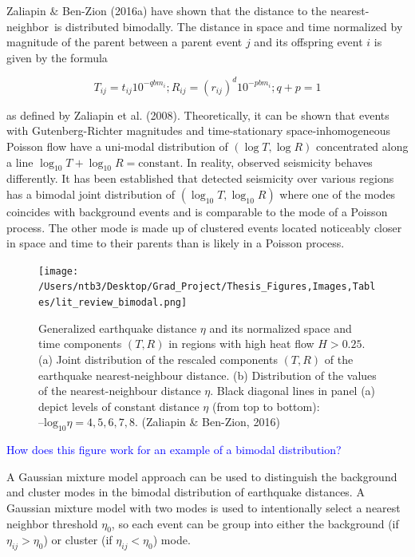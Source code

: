 \documentclass[12pt]{article} %
\theoremstyle{plain}
\begin{document}
	
	Zaliapin $\&$ Ben-Zion (2016a) have shown that the distance to the nearest-neighbor is distributed bimodally. The distance in space and time normalized by magnitude of the parent between a parent event $j$ and its offspring event $i$ is given by the formula
	
	
	\begin{equation} \label{eq:generalized_distance}
		T_{ij} = t_{ij}10^{-qbm_i};  R_{ij}= (r_{ij})^d10^{-pbm_i}; q+p=1
	\end{equation}
	
	\noindent as defined by Zaliapin et al. (2008). Theoretically, it can be shown that events with Gutenberg-Richter magnitudes and time-stationary space-inhomogeneous Poisson flow have a uni-modal distribution of $( \log T, \log R)$ concentrated along a line $\log_{10}T+ \log_{10}R = \text{constant}$. In reality, observed seismicity behaves differently. It has been established that detected seismicity over various regions has a bimodal joint distribution of $(\log_{10}T, \log_{10}R)$ where one of the modes coincides with background events and is comparable to the mode of a Poisson process. The other mode is made up of clustered events located noticeably closer in space and time to their parents than is likely in a Poisson process.
	
	\begin{figure}
		\centering
		\texttt{[image: /Users/ntb3/Desktop/Grad\_Project/Thesis\_Figures,Images,Tables/lit\_review\_bimodal.png]}
		\caption[Bimodal distribution of generalized earthquake distance $\eta$.]{Generalized earthquake distance $\eta$ and its normalized space and time components $(T, R)$ in regions with high heat flow $H > 0.25$. (a) Joint distribution of the rescaled components $(T, R)$ of the earthquake nearest-neighbour distance. (b) Distribution of the values of the nearest-neighbour distance $\eta$. Black diagonal lines in panel (a) depict levels of constant distance $\eta$ (from top to bottom): $–\text{log}_{10} \eta = 4, 5, 6, 7, 8$. (Zaliapin \& Ben-Zion, 2016)}
		\label{fig:bimodal}
	\end{figure}
	
	\textcolor{blue}{How does this figure work for an example of a bimodal distribution?}
	
	
	A Gaussian mixture model approach can be used to distinguish the background and cluster modes in the bimodal distribution of earthquake distances. A Gaussian mixture model with two modes is used to intentionally select a nearest neighbor threshold $\eta_0$, so each event can be group into either the background (if $\eta_{ij}>\eta_0$) or cluster (if $\eta_{ij} < \eta_0$) mode.
	
\end{document}
